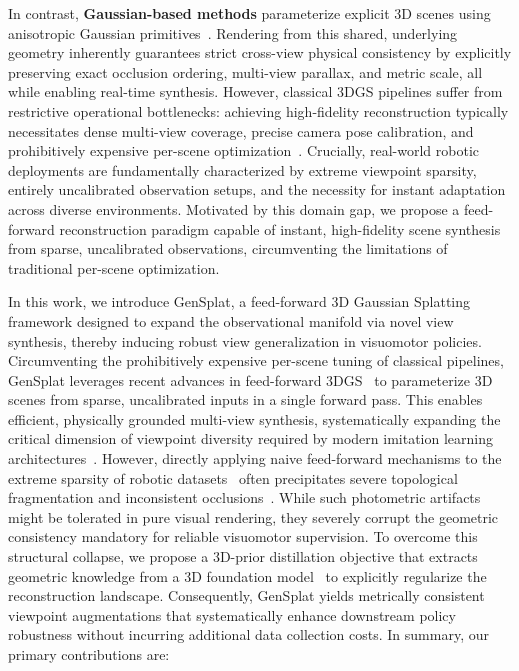 In contrast, \textbf{Gaussian-based methods} parameterize explicit 3D scenes using anisotropic Gaussian primitives~\cite{kerbl20233d,PapantonakisReduced3dgs}. Rendering from this shared, underlying geometry inherently guarantees strict cross-view physical consistency by explicitly preserving exact occlusion ordering, multi-view parallax, and metric scale, all while enabling real-time synthesis. However, classical 3DGS pipelines suffer from restrictive operational bottlenecks: achieving high-fidelity reconstruction typically necessitates dense multi-view coverage, precise camera pose calibration, and prohibitively expensive per-scene optimization~\cite{yang2025novel,torne2024robot,yu2025real2render2real,duan20244d,li2024robogsim}. Crucially, real-world robotic deployments are fundamentally characterized by extreme viewpoint sparsity, entirely uncalibrated observation setups, and the necessity for instant adaptation across diverse environments. Motivated by this domain gap, we propose a feed-forward reconstruction paradigm capable of instant, high-fidelity scene synthesis from sparse, uncalibrated observations, circumventing the limitations of traditional per-scene optimization.

In this work, we introduce GenSplat, a feed-forward 3D Gaussian Splatting framework designed to expand the observational manifold via novel view synthesis, thereby inducing robust view generalization in visuomotor policies. Circumventing the prohibitively expensive per-scene tuning of classical pipelines, GenSplat leverages recent advances in feed-forward 3DGS~\cite{ye2024no,jiang2025anysplat} to parameterize 3D scenes from sparse, uncalibrated inputs in a single forward pass. This enables efficient, physically grounded multi-view synthesis, systematically expanding the critical dimension of viewpoint diversity required by modern imitation learning architectures~\cite{saxena2025matters,black2410pi0,chi2023diffusion}. However, directly applying naive feed-forward mechanisms to the extreme sparsity of robotic datasets~\cite{o2024open,dasari2019robonet,khazatsky2024droid,walke2023bridgedata} often precipitates severe topological fragmentation and inconsistent occlusions~\cite{kerbl20233d,PapantonakisReduced3dgs}. While such photometric artifacts might be tolerated in pure visual rendering, they severely corrupt the geometric consistency mandatory for reliable visuomotor supervision. To overcome this structural collapse, we propose a 3D-prior distillation objective that extracts geometric knowledge from a 3D foundation model~\cite{wang2025pi} to explicitly regularize the reconstruction landscape. Consequently, GenSplat yields metrically consistent viewpoint augmentations that systematically enhance downstream policy robustness without incurring additional data collection costs.
In summary, our primary contributions are:

